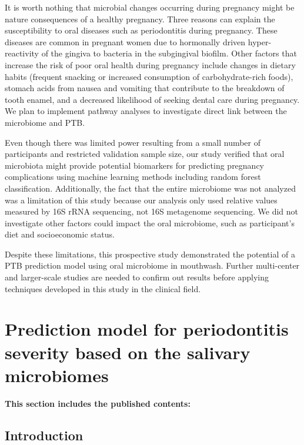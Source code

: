 \documentclass[11pt, a4paper, onecolumn, oneside]{report}
\begin{document}
            It is worth nothing that microbial changes occurring during pregnancy might be nature consequences of a healthy pregnancy. Three reasons can explain the susceptibility to oral diseases such as periodontitis during pregnancy. These diseases are common in pregnant women due to hormonally driven hyper-reactivity of the gingiva to bacteria in the subgingival biofilm. Other factors that increase the risk of poor oral health during pregnancy include changes in dietary habits (frequent snacking or increased consumption of carbohydrate-rich foods), stomach acids from nausea and vomiting that contribute to the breakdown of tooth enamel, and a decreased likelihood of seeking dental care during pregnancy. We plan to implement pathway analyses to investigate direct link between the microbiome and PTB.

            Even though there was limited power resulting from a small number of participants and restricted validation sample size, our study verified that oral microbiota might provide potential biomarkers for predicting pregnancy complications using machine learning methods including random forest classification. Additionally, the fact that the entire microbiome was not analyzed was a limitation of this study because our analysis only used relative values measured by 16S rRNA sequencing, not 16S metagenome sequencing. We did not investigate other factors could impact the oral microbiome, such as participant’s diet and socioeconomic status.

            Despite these limitations, this prospective study demonstrated the potential of a PTB prediction model using oral microbiome in mouthwash. Further multi-center and larger-scale studies are needed to confirm out results before applying techniques developed in this study in the clinical field.
        \newpage

    \section{Prediction model for periodontitis severity based on the salivary microbiomes}
        \label{section:Periodontitis}

        \textbf{This section includes the published contents:} \\

        \subsection{Introduction}
        \newpage
\end{document}
